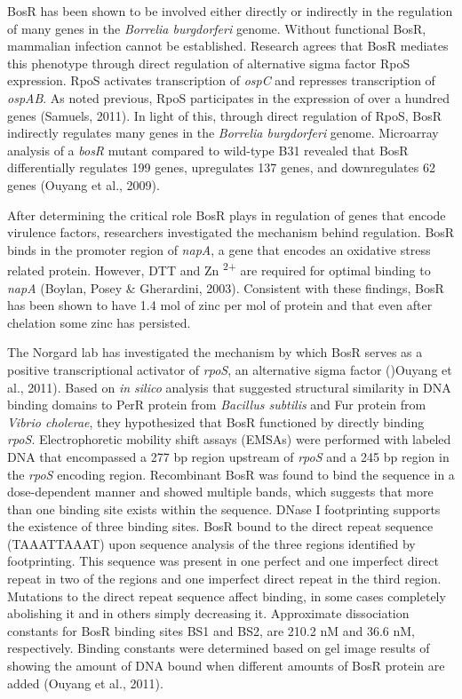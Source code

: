 \documentclass[12pt,twoside]{reedthesis}
\begin{document}
		
		BosR has been shown to be involved either directly or indirectly in the regulation of many genes in the \textit{Borrelia burgdorferi} genome. Without functional BosR, mammalian infection cannot be established. Research agrees that BosR mediates this phenotype through direct regulation of alternative sigma factor RpoS expression. RpoS activates transcription of \textit{ospC} and represses transcription of \textit{ospAB}. As noted previous, RpoS  participates in the expression of over a hundred genes (Samuels, 2011). In light of this, through direct regulation of RpoS, BosR indirectly regulates many genes in the \textit{Borrelia burgdorferi} genome. Microarray analysis of a \textit{bosR} mutant compared to wild-type B31 revealed that BosR differentially regulates 199 genes, upregulates 137 genes, and downregulates 62 genes (Ouyang et al., 2009).  
		
		
		
		
		After determining the critical role BosR plays in regulation of genes that encode virulence factors, researchers investigated the mechanism behind regulation.  BosR binds in the promoter region of \textit{napA}, a gene that encodes an oxidative stress related protein. However, DTT and Zn\textsuperscript{ 2+} are required  for optimal binding to \textit{napA} (Boylan, Posey \& Gherardini, 2003). Consistent with these findings, BosR has been shown to have 1.4 mol of zinc per mol of protein and that even after chelation some zinc has persisted.
		
		
		
	The Norgard lab has investigated the mechanism by which BosR serves as a positive transcriptional activator of \textit{rpoS}, an alternative sigma factor ()Ouyang et al., 2011). Based on \textit{in silico} analysis that suggested structural similarity in DNA binding domains to PerR protein from \textit{Bacillus subtilis} and Fur protein from \textit{Vibrio cholerae}, they hypothesized that BosR functioned by directly binding \textit{rpoS}. Electrophoretic mobility shift assays (EMSAs) were performed with labeled DNA that encompassed a 277 bp region upstream of \textit{rpoS} and a 245 bp region in the \textit{rpoS} encoding region. Recombinant BosR was found to bind the sequence in a dose-dependent manner and showed multiple bands, which suggests that more than one binding site exists within the sequence. DNase I footprinting supports the existence of three binding sites. BosR bound to the direct repeat sequence \-(TAAATTAAAT) upon sequence analysis of the three regions identified by footprinting. This sequence was present in one perfect and one imperfect direct repeat in two of the regions and one imperfect direct repeat in the third region. Mutations to the direct repeat sequence affect binding, in some cases completely abolishing it and in others simply decreasing it.  Approximate dissociation constants for BosR binding sites BS1 and BS2, are 210.2 nM and 36.6 nM, respectively. Binding constants were determined  based on gel image results of showing the amount of DNA bound when different amounts of BosR protein are added (Ouyang et al., 2011).
		
\end{document}
